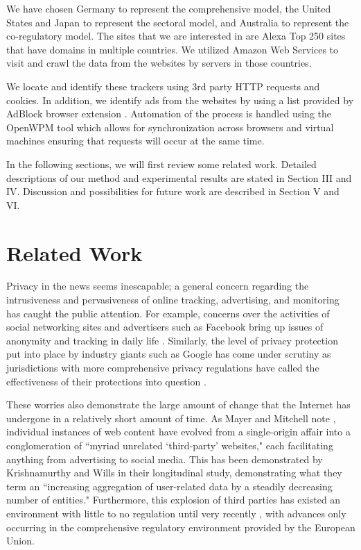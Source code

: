 \documentclass[conference]{IEEEtran}
\begin{document}
We have chosen Germany to represent the comprehensive model, the United States and Japan to represent the sectoral model, and Australia to represent the co-regulatory model. The sites that we are interested in are Alexa Top 250 sites \cite{Alexa} that have domains in multiple countries. We utilized Amazon Web Services to visit and crawl the data from the websites by servers in those countries.

We locate and identify these trackers using 3rd party HTTP requests and cookies. In addition, we identify ads from the websites by using a list provided by AdBlock browser extension \cite{adblock}. Automation of the process is handled using the OpenWPM \cite{openwpm} tool which allows for synchronization across browsers and virtual machines ensuring that requests will occur at the same time. 

In the following sections, we will first review some related work. Detailed descriptions of our method and experimental results are stated in Section III and IV. Discussion and possibilities for future work are described in Section V and VI.


\section{Related Work}
Privacy in the news seems inescapable; a general concern regarding the intrusiveness and pervasiveness of online tracking, advertising, and monitoring has caught the public attention. For example, concerns over the activities of social networking sites and advertisers such as Facebook  bring up issues of anonymity and tracking in daily life \cite{wsj_fb}. Similarly, the level of privacy protection put into place by industry giants such as Google has come under scrutiny as jurisdictions with more comprehensive privacy regulations have called the effectiveness of their protections into question \cite{Google_EU_marketingland}.

These worries also demonstrate the large amount of change that the Internet has undergone in a relatively short amount of time. As Mayer and Mitchell note \cite{Mayer_Mitchell}, individual instances of web content have evolved from a single-origin affair into a conglomeration of  ``myriad unrelated  `third-party' websites," each facilitating anything from advertising to social media. 
This has been demonstrated by Krishnamurthy and Wills \cite{Krishnamurthy} in their longitudinal study, demonstrating what they term an ``increasing aggregation of user-related data by a steadily decreasing number of entities."
Furthermore, this explosion of third parties has existed an environment with little to no regulation until very recently \cite{Mayer_Mitchell}, with advances only occurring in the comprehensive regulatory environment provided by the European Union.  
\end{document}
